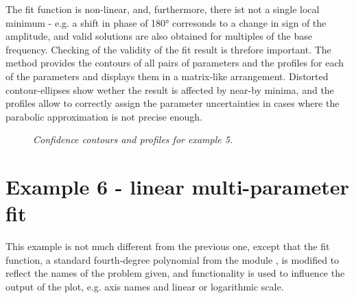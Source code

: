 \documentclass[a4paper,10pt,english]{sphinxmanual}
\begin{document}
The fit function is non-linear, and, furthermore, there ist not a single
local minimum - e.g. a shift in phase of 180° corresonds to a change in
sign of the amplitude, and valid solutions are also obtained for multiples
of the base frequency. Checking of the validity of the fit result is
threfore important. The method
 provides the
contours of all pairs of parameters and the profiles for each of
the parameters and displays them in a matrix-like arrangement.
Distorted contour-ellipses show wether the result is affected
by near-by minima, and the profiles allow to correctly assign
the parameter uncertainties in cases where the parabolic
approximation is not precise enough.
\begin{figure}[htbp]
\centering
\capstart

\caption{\emph{Confidence contours and profiles for example 5.}}\end{figure}


\section{Example 6 - linear multi-parameter fit}
\label{index:example-6-linear-multi-parameter-fit}
This example is not much different from the previous one, except that
the fit function, a standard fourth-degree polynomial from the module
{\hyperref[index:module-function_library]{}}, is modified to reflect the names of the problem
given, and  functionality is used to influence the
output of the plot, e.g. axis names and linear or logarithmic scale.
\end{document}

